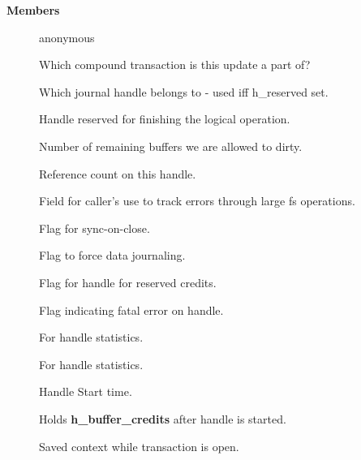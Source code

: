 \documentclass[a4paper,8pt,english]{sphinxmanual}
\begin{document}
\textbf{Members}
\begin{description}
\item[{}] \leavevmode
anonymous

\item[{}] \leavevmode
Which compound transaction is this update a part of?

\item[{}] \leavevmode
Which journal handle belongs to - used iff h\_reserved set.

\item[{}] \leavevmode
Handle reserved for finishing the logical operation.

\item[{}] \leavevmode
Number of remaining buffers we are allowed to dirty.

\item[{}] \leavevmode
Reference count on this handle.

\item[{}] \leavevmode
Field for caller's use to track errors through large fs operations.

\item[{}] \leavevmode
Flag for sync-on-close.

\item[{}] \leavevmode
Flag to force data journaling.

\item[{}] \leavevmode
Flag for handle for reserved credits.

\item[{}] \leavevmode
Flag indicating fatal error on handle.

\item[{}] \leavevmode
For handle statistics.

\item[{}] \leavevmode
For handle statistics.

\item[{}] \leavevmode
Handle Start time.

\item[{}] \leavevmode
Holds \textbf{h\_buffer\_credits} after handle is started.

\item[{}] \leavevmode
Saved context while transaction is open.

\end{description}
\end{document}
